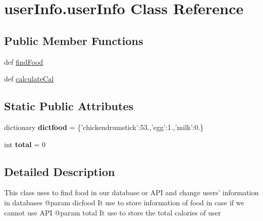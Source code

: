 \hypertarget{classuserInfo_1_1userInfo}{\section{user\-Info.\-user\-Info Class Reference}
\label{classuserInfo_1_1userInfo}
}
\subsection*{Public Member Functions}
\begin{DoxyCompactItemize}
\item 
def \hyperlink{classuserInfo_1_1userInfo_ad49633d7bf7bd27625cce3d4686b5b37}{find\-Food}
\item 
def \hyperlink{classuserInfo_1_1userInfo_a1f41fd1097c4b3401f5571b26602e965}{calculate\-Cal}
\end{DoxyCompactItemize}
\subsection*{Static Public Attributes}
\begin{DoxyCompactItemize}
\item 
\hypertarget{classuserInfo_1_1userInfo_aac40b4174c0fba076ae17d06366d7794}{dictionary {\bfseries dictfood} = \{'chickendrumstick'\-:53.,'egg'\-:1.,'milk'\-:0.\}}\label{classuserInfo_1_1userInfo_aac40b4174c0fba076ae17d06366d7794}

\item 
\hypertarget{classuserInfo_1_1userInfo_a87af9a3fe46b033310c86b7d47a7ca68}{int {\bfseries total} = 0}\label{classuserInfo_1_1userInfo_a87af9a3fe46b033310c86b7d47a7ca68}

\end{DoxyCompactItemize}


\subsection{Detailed Description}
\begin{DoxyVerb}This class uses to find food in our database or API
    and change users' information in databases
    @param dicfood It use to store information of food in case if we cannot use API
    @param total It use to store the total calories of user
\end{DoxyVerb}
 

